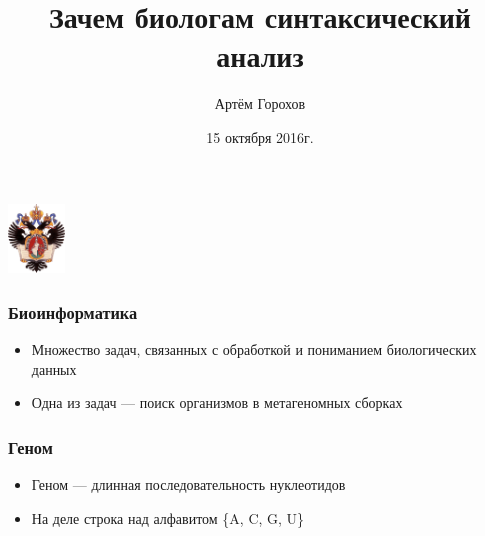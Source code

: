 \documentclass{beamer}
\title[]{Зачем биологам синтаксический анализ}
\institute[СПбГУ]{
    Санкт-Петербургский государственный университет \\
    Лаборатория языковых инструментов JetBrains}
\author[Артём Горохов]{Артём Горохов}
\date{15 октября 2016г.}
\begin{document}
    
    
    \begin{frame}
        \begin{center}
            {\includegraphics[width=1.5cm]{pictures/SPbGU_Logo.png}}
        \end{center}
        \titlepage
    \end{frame}
    
    \begin{frame}
        \frametitle{Биоинформатика}
        \begin{itemize}
            \item Множество задач, связанных с обработкой и пониманием биологических данных
            \item Одна из задач --- поиск организмов в метагеномных сборках
        \end{itemize}
    \end{frame}
    
    \begin{frame}
        \frametitle{Геном}
        \begin{itemize}
            \item Геном --- длинная последовательность нуклеотидов
            \item На деле строка над алфавитом \{A, C, G, U\}
        \end{itemize}
    \end{frame}
    
\end{document}
